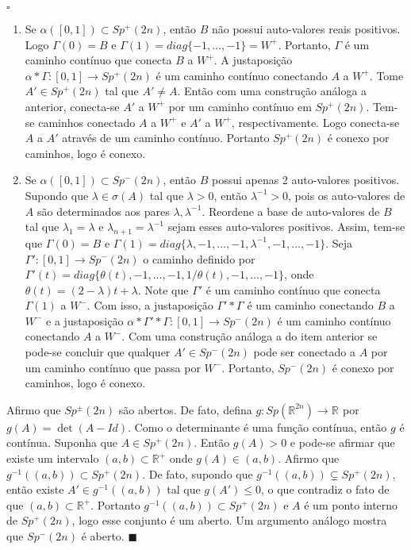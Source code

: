 \documentclass[12pt]{book}
\newenvironment{prova}[1]{$\square$ #1}{\hfill$\blacksquare$}
\newcommand{\gruposimpletico}[1]{Sp(#1)}
\newcommand{\gruposimpleticonaodegenerado}[1]{Sp^{#1}(2n)}
\newcommand{\intervalo}{[0,1]}
\newcommand{\real}[1]{\mathbb{R}^{#1}}
\newcommand{\reta}{\real{}}
\begin{document}
\begin{prova}
		\begin{enumerate}
			\item Se $\alpha([0,1]) \subset \gruposimpleticonaodegenerado{+}$, então $B$ não possui auto-valores reais positivos. Logo $\Gamma(0) = B$ e $\Gamma(1) = diag \{-1, \dots, -1\} = W^{+}$. Portanto, $\Gamma$ é um caminho contínuo que conecta $B$ a $W^{+}$. A justaposição $\alpha * \Gamma:\intervalo \to \gruposimpleticonaodegenerado{+}$
			é um caminho contínuo conectando $A$ a $W^{+}$. Tome $A' \in \gruposimpleticonaodegenerado{+}$ tal que $A'\neq A$. Então com uma construção análoga a anterior, conecta-se $A'$ a $W^{+}$ por um caminho contínuo em $\gruposimpleticonaodegenerado{+}$. Tem-se caminhos conectado $A$ a $W^{+}$ e $A'$ a $W^{+}$, respectivamente. Logo conecta-se $A$ a $A'$ através de um caminho contínuo. Portanto $\gruposimpleticonaodegenerado{+}$ é conexo por caminhos, logo é conexo.
			
			\item Se $\alpha([0,1]) \subset \gruposimpleticonaodegenerado{-}$, então $B$ possui apenas 2 auto-valores positivos. Supondo que $\lambda \in \sigma(A)$ tal que $\lambda > 0$, então $\lambda^{-1} > 0$, pois os auto-valores de $A$ são determinados aos pares $\lambda, \lambda^{-1}$. Reordene a base de auto-valores de $B$ tal que $\lambda_{1}=\lambda$ e $\lambda_{n+1}=\lambda^{-1}$ sejam esses auto-valores positivos. Assim, tem-se que $\Gamma(0) = B$ e $\Gamma(1) = diag\{\lambda, -1, \dots, -1, \lambda^{-1}, -1, \dots, -1\}$. Seja $\Gamma': \intervalo \to \gruposimpleticonaodegenerado{-}$ o caminho definido por $\Gamma'(t)=diag\{ \theta(t), -1,\dots, -1, 1/\theta(t) ,-1,\dots, -1\}$,
			onde $\theta(t)=(2- \lambda)t + \lambda$. Note que $\Gamma'$ é um caminho contínuo que conecta $\Gamma(1)$ a $W^{-}$. Com isso, a justaposição $\Gamma'*\Gamma$ é um caminho conectando $B$ a $W^{-}$ e a justaposição $\alpha * \Gamma'*\Gamma: \intervalo \to \gruposimpleticonaodegenerado{-}$ é um caminho contínuo conectando $A$ a $W^{-}$. Com uma construção análoga a do item anterior se pode-se concluir que qualquer $A' \in \gruposimpleticonaodegenerado{-}$ pode ser conectado a $A$ por um caminho contínuo que passa por $W^{-}$. Portanto, $\gruposimpleticonaodegenerado{-}$ é conexo por caminhos, logo é conexo.
		\end{enumerate}
		
		Afirmo que $\gruposimpleticonaodegenerado{\pm}$ são abertos. De fato, defina $g:\gruposimpletico{\real{2n}}\to \reta$ por $g(A) = \det(A-Id)$. Como o determinante é uma função contínua, então $g$ é contínua. Suponha que $A \in \gruposimpleticonaodegenerado{+}$. Então $g(A)>0$ e pode-se afirmar que existe um intervalo $(a,b) \subset \real{+}$ onde $g(A)\in (a,b)$. Afirmo que $g^{-1}((a,b))\subset \gruposimpleticonaodegenerado{+}$.  De fato, supondo que $g^{-1}((a,b)) \varsubsetneq \gruposimpleticonaodegenerado{+}$, então existe $A' \in g^{-1}((a,b))$ tal que $g(A')\leq 0$, o que contradiz o fato de que $(a,b) \subset \real{+}$. Portanto $g^{-1}((a,b)) \subset \gruposimpleticonaodegenerado{+}$ e $A$ é um ponto interno de $\gruposimpleticonaodegenerado{+}$, logo esse conjunto é um aberto. Um argumento análogo mostra que $\gruposimpleticonaodegenerado{-}$ é aberto.
	\end{prova}
	
\end{document}
